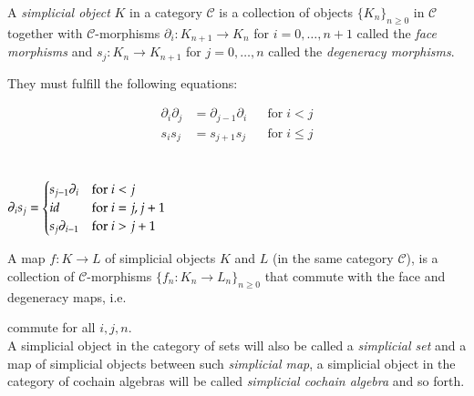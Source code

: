  \begin{Definition}
  A \emph{simplicial object} $K$ in a category $\mathscr{C}$
  is a collection of objects ${\lbrace K_n \rbrace}_{n \geq 0}$ in $\mathscr{C}$ together with $\mathscr{C}$-morphisms
  $\partial_i \colon K_{n+1} \to K_n$ for $i = 0, \ldots, n+1$ called the \emph{face morphisms} and 
  $s_j \colon K_n \to K_{n+1}$ for $j = 0, \ldots, n$ called the \emph{degeneracy morphisms}.
  
  They must fulfill the following equations: 
    \begin{multicols}{2}
     \begin{align*}
      \partial_i \partial_j &= \partial_{j-1} \partial_i & & \text{for} \; i < j \\
      s_i s_j &= s_{j+1} s_j & & \text{for} \; i \leq j
     \end{align*}
\columnbreak
\\ \\
      $\partial_i s_j = \begin{cases}
              s_{j-1} \partial_i 	&\text{for $i < j$} \\
              id 	&\text{for $i = j, j+1$} \\
              s_j \partial_{i-1}	 &\text{for $ i > j + 1$}
             
             \end{cases}
	      $
  \end{multicols}

    A map $f \colon K \to L$ of simplicial objects $K$ and $L$ (in the same category $\mathscr{C}$), is a collection
    of $\mathscr{C}$-morphisms ${\lbrace f_n \colon K_n \to L_n\rbrace }_{ n \geq 0}$ that commute with the face and degeneracy maps, i.e.\
    
  \centerline{
  }  
    
    commute for all $i,j,n$. \\
   A simplicial object in the category of sets will also be called a \emph{simplicial set} and a map 
   of simplicial objects between such \emph{simplicial map}, a simplicial object in the category of 
   cochain algebras will be called \emph{simplicial cochain algebra} and so forth.
  
 \end{Definition}

